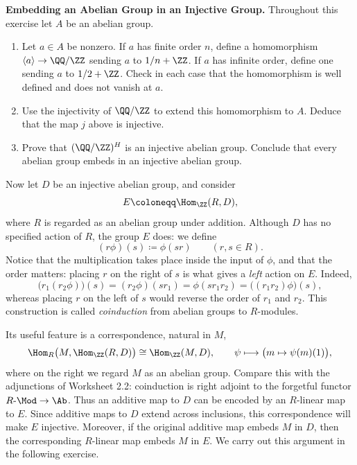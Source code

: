 \documentclass[12pt,reqno]{amsart}
\begin{document}
\hrulefill

\begin{problems}
\item\label{h:cogenerator} \textbf{Embedding an Abelian Group in an Injective Group.} Throughout this exercise let $A$ be an abelian group.
\begin{enumerate}
\item Let $a\in A$ be nonzero. If $a$ has finite order $n$, define a homomorphism $\langle a\rangle\to\QQ/\ZZ$ sending $a$ to $1/n+\ZZ$. If $a$ has infinite order, define one sending $a$ to $1/2+\ZZ$. Check in each case that the homomorphism is well defined and does not vanish at $a$.
\item Use the injectivity of $\QQ/\ZZ$ to extend this homomorphism to $A$. Deduce that the map $j$ above is injective.
\item Prove that $(\QQ/\ZZ)^H$ is an injective abelian group. Conclude that every abelian group embeds in an injective abelian group.
\end{enumerate}
\end{problems}

\hrulefill

Now let $D$ be an injective abelian group, and consider
\[
E\coloneqq\Hom_{\ZZ}(R,D),
\]
where $R$ is regarded as an abelian group under addition. Although $D$ has no specified action of $R$, the group $E$ does: we define
\[
(r\phi)(s)\coloneqq\phi(sr)\qquad(r,s\in R).
\]
Notice that the multiplication takes place inside the input of $\phi$, and that the order matters: placing $r$ on the right of $s$ is what gives a \emph{left} action on $E$. Indeed,
\[
\bigl(r_1(r_2\phi)\bigr)(s)=(r_2\phi)(sr_1)=\phi(sr_1r_2)=\bigl((r_1r_2)\phi\bigr)(s),
\]
whereas placing $r$ on the left of $s$ would reverse the order of $r_1$ and $r_2$. This construction is called \emph{coinduction} from abelian groups to $R$-modules.

Its useful feature is a correspondence, natural in $M$,
\[
\Hom_R\bigl(M,\Hom_{\ZZ}(R,D)\bigr)\cong\Hom_{\ZZ}(M,D),\qquad\psi\longmapsto\bigl(m\mapsto\psi(m)(1)\bigr),
\]
where on the right we regard $M$ as an abelian group. Compare this with the adjunctions of Worksheet 2.2: coinduction is right adjoint to the forgetful functor $R\text{-}\Mod\to\Ab$. Thus an additive map to $D$ can be encoded by an $R$-linear map to $E$. Since additive maps to $D$ extend across inclusions, this correspondence will make $E$ injective. Moreover, if the original additive map embeds $M$ in $D$, then the corresponding $R$-linear map embeds $M$ in $E$. We carry out this argument in the following exercise.
\end{document}

